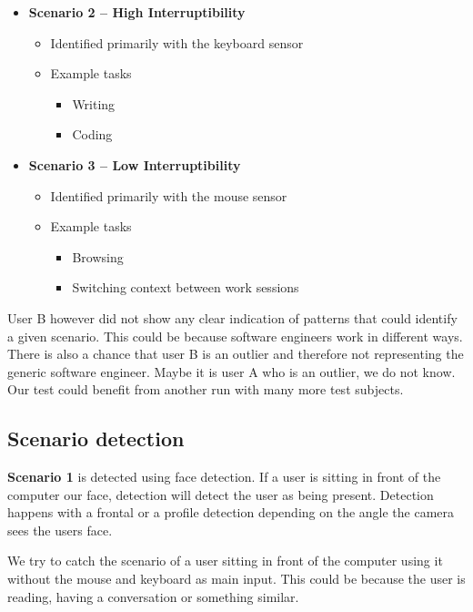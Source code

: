 \documentclass{sigchi}
\begin{document}
\begin{itemize}
  \item \textbf{Scenario 2 – High Interruptibility}
  \begin{itemize}
    \item Identified primarily with the keyboard sensor
    \item Example tasks
    \begin{itemize}
      \item Writing
      \item Coding
    \end{itemize}
  \end{itemize}
\end{itemize}

\begin{itemize}
  \item \textbf{Scenario 3 – Low Interruptibility}
  \begin{itemize}
    \item Identified primarily with the mouse sensor
    \item Example tasks
    \begin{itemize}
      \item Browsing
      \item Switching context between work sessions
    \end{itemize}
  \end{itemize}
\end{itemize}

User B however did not show any clear indication of patterns that could identify a given scenario.
This could be because software engineers work in different ways.
There is also a chance that user B is an outlier and therefore not representing the generic software engineer.
Maybe it is user A who is an outlier, we do not know.
Our test could benefit from another run with many more test subjects.

\subsection{Scenario detection}
\textbf{Scenario 1} is detected using face detection.
If a user is sitting in front of the computer our face, detection will detect the user as being present.
Detection happens with a frontal or a profile detection depending on the angle the camera sees the users face.

We try to catch the scenario of a user sitting in front of the computer using it without the mouse and keyboard as main input.
This could be because the user is reading, having a conversation or something similar.
\end{document}
